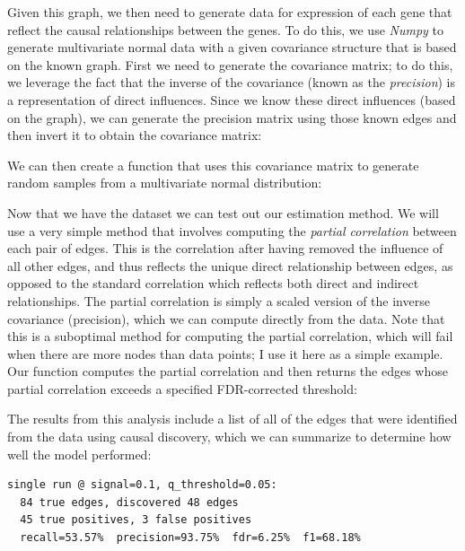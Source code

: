 Given this graph, we then need to generate data for expression of each gene that reflect the causal relationships between the genes.  To do this, we use \textit{Numpy} to generate multivariate normal data with a given covariance structure that is based on the known graph.  First we need to generate the covariance matrix; to do this, we leverage the fact that the inverse of the covariance (known as the \textit{precision}) is a representation of direct influences. Since we know these direct influences (based on the graph), we can generate the precision matrix using those known edges and then invert it to obtain the covariance matrix:



We can then create a function that uses this covariance matrix to generate random samples from a multivariate normal distribution:



Now that we have the dataset we can test out our estimation method. We will use a very simple method that involves computing the \textit{partial correlation} between each pair of edges. This is the correlation after having removed the influence of all other edges, and thus reflects the unique direct relationship between edges, as opposed to the standard correlation which reflects both direct and indirect relationships.  The partial correlation is simply a scaled version of the inverse covariance (precision), which we can compute directly from the data.  Note that this is a suboptimal method for computing the partial correlation, which will fail when there are more nodes than data points; I use it here as a simple example.  Our function computes the partial correlation and then returns the edges whose partial correlation exceeds a specified FDR-corrected threshold:



The results from this analysis include a list of all of the edges that were identified from the data using causal discovery, which we can summarize to determine how well the model performed:



\begin{lstlisting}[style=shell]
single run @ signal=0.1, q_threshold=0.05:
  84 true edges, discovered 48 edges
  45 true positives, 3 false positives
  recall=53.57%  precision=93.75%  fdr=6.25%  f1=68.18%
\end{lstlisting}

